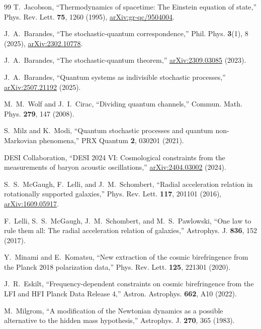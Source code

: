 \documentclass[aps,prd,twocolumn,superscriptaddress,nofootinbib]{revtex4-2}
\begin{document}
\begin{thebibliography}{99}
 T.~Jacobson, ``Thermodynamics of spacetime: The Einstein equation of state,'' Phys. Rev. Lett. \textbf{75}, 1260 (1995), \href{https://arxiv.org/abs/gr-qc/9504004}{arXiv:gr-qc/9504004}.

 J.~A.~Barandes, ``The stochastic-quantum correspondence,'' Phil. Phys. \textbf{3}(1), 8 (2025), \href{https://arxiv.org/abs/2302.10778}{arXiv:2302.10778}.

 J.~A.~Barandes, ``The stochastic-quantum theorem,'' \href{https://arxiv.org/abs/2309.03085}{arXiv:2309.03085} (2023).

 J.~A.~Barandes, ``Quantum systems as indivisible stochastic processes,'' \href{https://arxiv.org/abs/2507.21192}{arXiv:2507.21192} (2025).

 M.~M.~Wolf and J.~I.~Cirac, ``Dividing quantum channels,'' Commun. Math. Phys. \textbf{279}, 147 (2008).

 S.~Milz and K.~Modi, ``Quantum stochastic processes and quantum non-Markovian phenomena,'' PRX Quantum \textbf{2}, 030201 (2021).

 DESI Collaboration, ``DESI 2024 VI: Cosmological constraints from the measurements of baryon acoustic oscillations,'' \href{https://arxiv.org/abs/2404.03002}{arXiv:2404.03002} (2024).

 S.~S.~McGaugh, F.~Lelli, and J.~M.~Schombert, ``Radial acceleration relation in rotationally supported galaxies,'' Phys. Rev. Lett. \textbf{117}, 201101 (2016), \href{https://arxiv.org/abs/1609.05917}{arXiv:1609.05917}.

 F.~Lelli, S.~S.~McGaugh, J.~M.~Schombert, and M.~S.~Pawlowski, ``One law to rule them all: The radial acceleration relation of galaxies,'' Astrophys. J. \textbf{836}, 152 (2017).

 Y.~Minami and E.~Komatsu, ``New extraction of the cosmic birefringence from the Planck 2018 polarization data,'' Phys. Rev. Lett. \textbf{125}, 221301 (2020).

 J.~R.~Eskilt, ``Frequency-dependent constraints on cosmic birefringence from the LFI and HFI Planck Data Release 4,'' Astron. Astrophys. \textbf{662}, A10 (2022).

 M.~Milgrom, ``A modification of the Newtonian dynamics as a possible alternative to the hidden mass hypothesis,'' Astrophys. J. \textbf{270}, 365 (1983).


\end{thebibliography}
\end{document}
